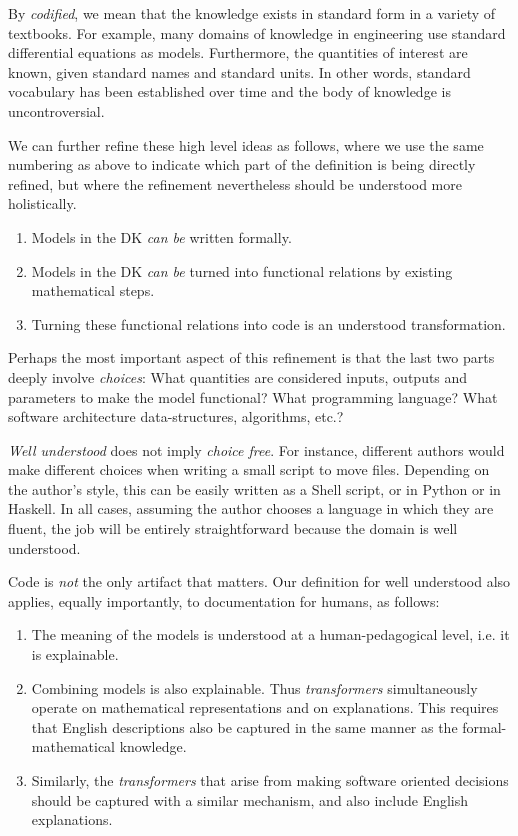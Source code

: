 \documentclass[sigconf,review]{acmart}
\begin{document}
By \emph{codified}, we mean that the knowledge exists in standard form in a
variety of textbooks. For example, many domains of knowledge in engineering use
standard differential equations as models. Furthermore, the quantities of
interest are known, given standard names and standard units. In other words,
standard vocabulary has been established over time and the body of knowledge is
uncontroversial.

We can further refine these high level ideas as follows, where we use
the same numbering as above to indicate which part of the definition is
being directly refined, but where the refinement nevertheless should be
understood more holistically.
\begin{enumerate}
\item Models in the DK \emph{can be} written formally.
\item Models in the DK \emph{can be} turned into functional relations by
 existing mathematical steps.
\item Turning these functional relations into code is an understood
 transformation.
\end{enumerate}
Perhaps the most important aspect of this refinement is that the last two parts
deeply involve \emph{choices}: What quantities are considered inputs, outputs
and parameters to make the model functional? What programming language?  What
software architecture data-structures, algorithms, etc.?

\emph{Well understood} does not imply \emph{choice free}.  For instance,
different authors would make different choices when writing a small script to
move files.  Depending on the author's style, this can be easily written as a
Shell script, or in Python or in Haskell. In all cases, assuming the author
chooses a language in which they are fluent, the job will be entirely
straightforward because the domain is well understood.

Code is \emph{not} the only artifact that matters.  Our definition for well
understood also applies, equally importantly, to documentation for humans, as
follows:
\begin{enumerate}
\item The meaning of the models is understood at a human-pedagogical
level, i.e. it is explainable.
\item Combining models is also explainable. Thus \emph{transformers}
  simultaneously operate on mathematical representations
and on explanations. This requires that English descriptions also be
captured in the same manner as the formal-mathematical knowledge.
\item Similarly, the \emph{transformers} that arise from making software
oriented decisions should be captured with a similar mechanism, and also include
English explanations.
\end{enumerate}
\end{document}

